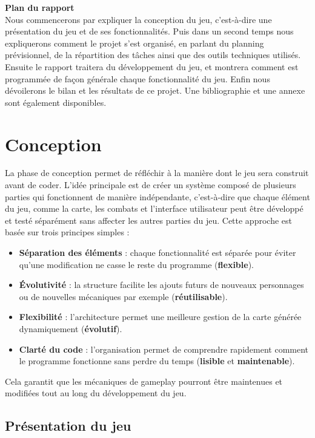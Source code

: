 \documentclass[11pt,a4paper]{article}
\begin{document}
\medskip

\textbf{Plan du rapport} \\
Nous commencerons par expliquer la conception du jeu, c'est-à-dire une présentation du jeu et de ses fonctionnalités.
Puis dans un second temps nous expliquerons comment le projet s'est organisé, en parlant du planning prévisionnel, de la répartition des tâches ainsi que des outils techniques utilisés.
Ensuite le rapport traitera du développement du jeu, et montrera comment est programmée de façon générale chaque fonctionnalité du jeu.
Enfin nous dévoilerons le bilan et les résultats de ce projet.
Une bibliographie et une annexe sont également disponibles.

\section{Conception}

La phase de conception permet de réfléchir à la manière dont le jeu sera construit avant de coder. L'idée principale est de créer un système composé de plusieurs parties qui fonctionnent de manière indépendante, c'est-à-dire que chaque élément du jeu, comme la carte, les combats et l'interface utilisateur peut être développé et testé séparément sans affecter les autres parties du jeu. Cette approche est basée sur trois principes simples :

\begin{itemize}
    \item \textbf{Séparation des éléments} : chaque fonctionnalité est séparée pour éviter qu'une modification ne casse le reste du programme (\textbf{flexible}).
    \item \textbf{Évolutivité} : la structure facilite les ajouts futurs de nouveaux personnages ou de nouvelles mécaniques par exemple (\textbf{réutilisable}).
    \item \textbf{Flexibilité} : l'architecture permet une meilleure gestion de la carte générée dynamiquement (\textbf{évolutif}).
    \item \textbf{Clarté du code} : l'organisation permet de comprendre rapidement comment le programme fonctionne sans perdre du temps (\textbf{lisible} et \textbf{maintenable}).
\end{itemize}

Cela garantit que les mécaniques de gameplay pourront être maintenues et modifiées tout au long du développement du jeu.

\subsection{Présentation du jeu}
\end{document}
